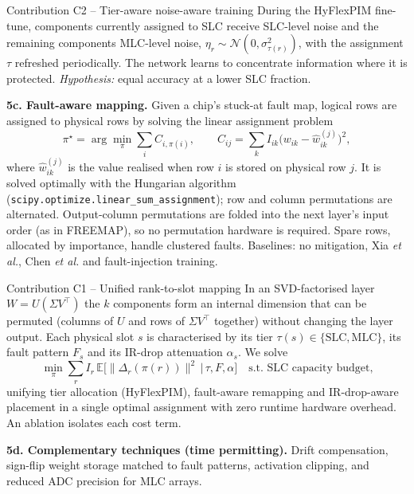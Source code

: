 \documentclass[10pt,a4paper]{article}
\begin{document}
\begin{contribbox}{Contribution C2 -- Tier-aware noise-aware training}
During the HyFlexPIM fine-tune, components currently assigned to SLC receive SLC-level noise and the
remaining components MLC-level noise, $\eta_r\sim\mathcal N(0,\sigma^2_{\tau(r)})$, with the assignment
$\tau$ refreshed periodically. The network learns to concentrate information where it is protected.
\emph{Hypothesis:} equal accuracy at a lower SLC fraction.
\end{contribbox}

\textbf{5c. Fault-aware mapping.} Given a chip's stuck-at fault map, logical rows are assigned to
physical rows by solving the linear assignment problem
\begin{equation}
\pi^\star=\arg\min_\pi\sum_i C_{i,\pi(i)},\qquad C_{ij}=\sum_k I_{ik}\big(w_{ik}-\hat w^{(j)}_{ik}\big)^2,
\end{equation}
where $\hat w^{(j)}_{ik}$ is the value realised when row $i$ is stored on physical row $j$. It is solved
optimally with the Hungarian algorithm (\texttt{scipy.optimize.linear\_sum\_assignment}); row and column
permutations are alternated. Output-column permutations are folded into the next layer's input order (as
in FREEMAP), so no permutation hardware is required. Spare rows, allocated by importance, handle
clustered faults. Baselines: no mitigation, Xia \emph{et al.}, Chen \emph{et al.} and fault-injection
training.

\begin{contribbox}{Contribution C1 -- Unified rank-to-slot mapping}
In an SVD-factorised layer $W=U(\Sigma V^{\top})$ the $k$ components form an internal dimension that can be
permuted (columns of $U$ and rows of $\Sigma V^{\top}$ together) without changing the layer output. Each
physical slot $s$ is characterised by its tier $\tau(s)\in\{\mathrm{SLC},\mathrm{MLC}\}$, its fault
pattern $F_s$ and its IR-drop attenuation $\alpha_s$. We solve
\[
\min_\pi\sum_r I_r\,\mathbb E\big[\|\Delta_r(\pi(r))\|^2\,\big|\,\tau,F,\alpha\big]\quad
\text{s.t. SLC capacity budget,}
\]
unifying tier allocation (HyFlexPIM), fault-aware remapping and IR-drop-aware placement in a single optimal
assignment with zero runtime hardware overhead. An ablation isolates each cost term.
\end{contribbox}

\textbf{5d. Complementary techniques (time permitting).} Drift compensation, sign-flip weight storage
matched to fault patterns, activation clipping, and reduced ADC precision for MLC arrays.
\end{document}
